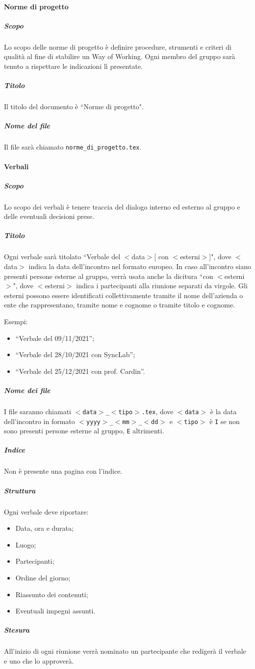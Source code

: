 \documentclass[a4paper, 12pt]{article}
\begin{document}
\paragraph{Norme di progetto}
\subparagraph{Scopo}
Lo scopo delle norme di progetto è definire procedure, strumenti e criteri di qualità al fine di stabilire un Way of Working. Ogni membro del gruppo sarà tenuto a rispettare le indicazioni lì presentate.
\subparagraph{Titolo}
Il titolo del documento è ``Norme di progetto".
\subparagraph{Nome del file}
Il file sarà chiamato \texttt{norme\_di\_progetto.tex}.

\paragraph{Verbali}
\subparagraph{Scopo}
Lo scopo dei verbali è tenere traccia del dialogo interno ed esterno al gruppo e delle eventuali decisioni prese.
\subparagraph{Titolo}
Ogni verbale sarà titolato ``Verbale del $<$data$>$[ con $<$esterni$>$]", dove $<$data$>$ indica la data dell'incontro nel formato europeo. In caso all'incontro siano presenti persone esterne al gruppo, verrà usata anche la dicitura ``con $<$esterni$>$", dove $<$esterni$>$ indica i partecipanti alla riunione separati da virgole. Gli esterni possono essere identificati collettivamente tramite il nome dell'azienda o ente che rappresentano, tramite nome e cognome o tramite titolo e cognome.

Esempi:
\begin{itemize}
\item ``Verbale del 09/11/2021'';
\item ``Verbale del 28/10/2021 con SyncLab'';
\item ``Verbale del 25/12/2021 con prof. Cardin''.
\end{itemize}
\subparagraph{Nome dei file}
I file saranno chiamati \texttt{$<$data$>$\_$<$tipo$>$.tex}, dove \texttt{$<$data$>$} è la data dell'incontro in formato \texttt{$<$yyyy$>$\_$<$mm$>$\_$<$dd$>$} e \texttt{$<$tipo$>$} è \texttt{I} se non sono presenti persone esterne al gruppo, \texttt{E} altrimenti.
\subparagraph{Indice}
Non è presente una pagina con l'indice.
\subparagraph{Struttura}
Ogni verbale deve riportare:
\begin{itemize}
\item Data, ora e durata;
\item Luogo;
\item Partecipanti;
\item Ordine del giorno;
\item Riassunto dei contenuti;
\item Eventuali impegni assunti.
\end{itemize}
\subparagraph{Stesura}\label{documentazione-documenti-verbali-stesura}
All'inizio di ogni riunione verrà nominato un partecipante che redigerà il verbale e uno che lo approverà.
\end{document}
